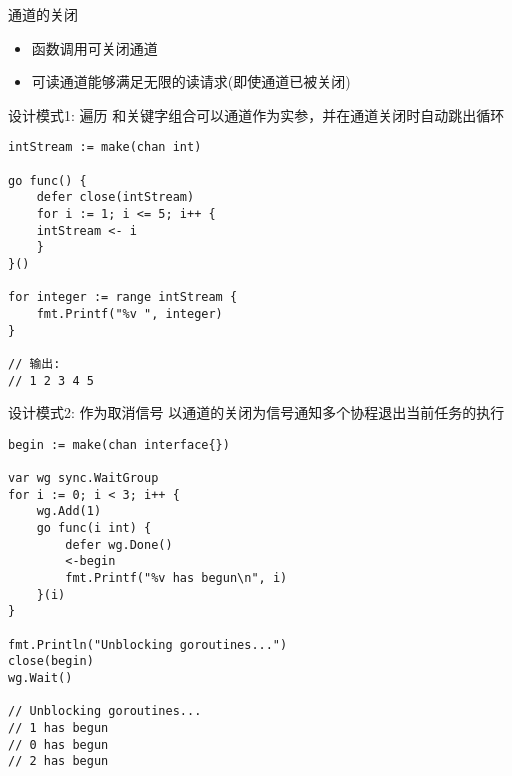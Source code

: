 \begin{frame}{通道的关闭}
    \begin{itemize}
        \item {}函数调用可关闭通道
        \item 可读通道能够满足无限的读请求(即使通道已被关闭)
    \end{itemize}
\end{frame}

\begin{frame}[fragile]{设计模式1: 遍历}
    和关键字组合可以通道作为实参，并在通道关闭时自动跳出循环
\begin{lstlisting}
intStream := make(chan int)

go func() {
    defer close(intStream)
    for i := 1; i <= 5; i++ {
    intStream <- i
    }
}()

for integer := range intStream {
    fmt.Printf("%v ", integer)
}

// 输出:
// 1 2 3 4 5 
\end{lstlisting}    
\end{frame}

\begin{frame}[fragile]{设计模式2: 作为取消信号}
    以通道的关闭为信号通知多个协程退出当前任务的执行
\begin{lstlisting}
begin := make(chan interface{})

var wg sync.WaitGroup
for i := 0; i < 3; i++ {
    wg.Add(1)
    go func(i int) {
        defer wg.Done()
        <-begin
        fmt.Printf("%v has begun\n", i)
    }(i)
}

fmt.Println("Unblocking goroutines...")
close(begin)
wg.Wait()

// Unblocking goroutines...
// 1 has begun
// 0 has begun
// 2 has begun
\end{lstlisting}
\end{frame}

